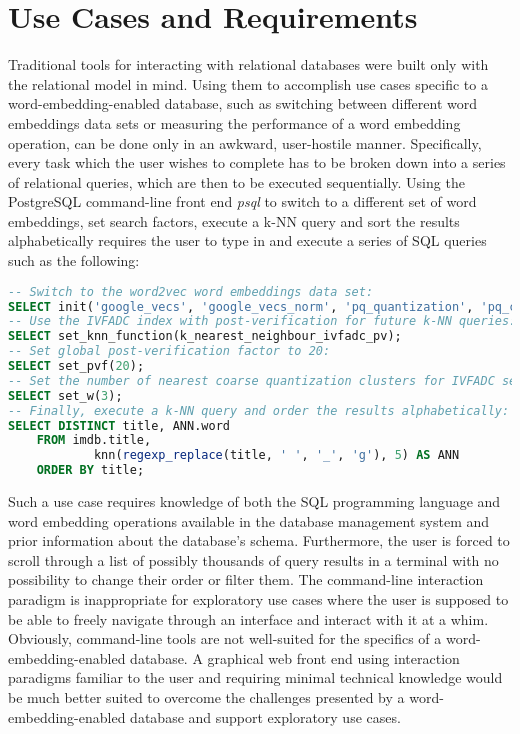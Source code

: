 
\chapter{Use Cases and Requirements}
\label{cha:usecase}
Traditional tools for interacting with relational databases were built only with the relational model in mind. Using them to accomplish use cases specific to a word-embedding-enabled database, such as switching between different word embeddings data sets or measuring the performance of a word embedding operation, can be done only in an awkward, user-hostile manner. Specifically, every task which the user wishes to complete has to be broken down into a series of relational queries, which are then to be executed sequentially. Using the PostgreSQL command-line front end \textit{psql} to switch to a different set of word embeddings, set search factors, execute a k-NN query and sort the results alphabetically requires the user to type in and execute a series of SQL queries such as the following:
\begin{lstlisting}[language=SQL,breaklines=true]
-- Switch to the word2vec word embeddings data set:
SELECT init('google_vecs', 'google_vecs_norm', 'pq_quantization', 'pq_codebook', 'fine_quantization', 'coarse_quantization', 'residual_codebook');
-- Use the IVFADC index with post-verification for future k-NN queries:
SELECT set_knn_function(k_nearest_neighbour_ivfadc_pv);
-- Set global post-verification factor to 20:
SELECT set_pvf(20);
-- Set the number of nearest coarse quantization clusters for IVFADC search to 3:
SELECT set_w(3);
-- Finally, execute a k-NN query and order the results alphabetically:
SELECT DISTINCT title, ANN.word
	FROM imdb.title, 
			knn(regexp_replace(title, ' ', '_', 'g'), 5) AS ANN
	ORDER BY title;
\end{lstlisting}
Such a use case requires knowledge of both the SQL programming language and word embedding operations available in the database management system and prior information about the database's schema. Furthermore, the user is forced to scroll through a list of possibly thousands of query results in a terminal with no possibility to change their order or filter them. The command-line interaction paradigm is inappropriate for exploratory use cases where the user is supposed to be able to freely navigate through an interface and interact with it at a whim. Obviously, command-line tools are not well-suited for the specifics of a word-embedding-enabled database. A graphical web front end using interaction paradigms familiar to the user and requiring minimal technical knowledge would be much better suited to overcome the challenges presented by a word-embedding-enabled database and support exploratory use cases.

